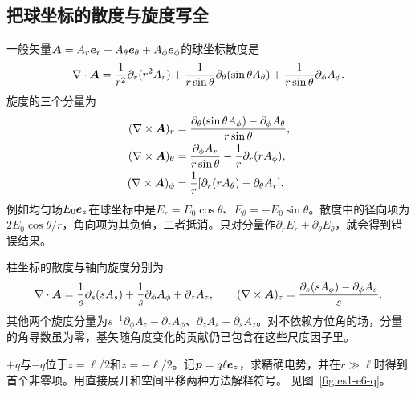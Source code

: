 \subsection{把球坐标的散度与旋度写全}
一般矢量$\bm{A}=A_r\bm{e}_r+A_\theta\bm{e}_\theta+A_\phi\bm{e}_\phi$的球坐标散度是
\[\nabla\cdot\bm{A}=\frac1{r^2}\partial_r(r^2A_r)
+\frac1{r\sin\theta}\partial_\theta(\sin\theta A_\theta)
+\frac1{r\sin\theta}\partial_\phi A_\phi.
\]
旋度的三个分量为
\[\begin{aligned}
(\nabla\times\bm{A})_r&=\frac{\partial_\theta(\sin\theta A_\phi)-\partial_\phi A_\theta}{r\sin\theta},\\
(\nabla\times\bm{A})_\theta&=\frac{\partial_\phi A_r}{r\sin\theta}-\frac1r\partial_r(rA_\phi),\\
(\nabla\times\bm{A})_\phi&=\frac1r[\partial_r(rA_\theta)-\partial_\theta A_r].
\end{aligned}\]
例如均匀场$E_0\bm{e}_z$在球坐标中是$E_r=E_0\cos\theta$、$E_\theta=-E_0\sin\theta$。散度中的径向项为$2E_0\cos\theta/r$，角向项为其负值，二者抵消。只对分量作$\partial_rE_r+\partial_\theta E_\theta$，就会得到错误结果。

柱坐标的散度与轴向旋度分别为
\[\nabla\cdot\bm{A}=\frac1s\partial_s(sA_s)+\frac1s\partial_\phi A_\phi+\partial_zA_z,
\qquad (\nabla\times\bm{A})_z=\frac{\partial_s(sA_\phi)-\partial_\phi A_s}{s}.
\]
其他两个旋度分量为$s^{-1}\partial_\phi A_z-\partial_zA_\phi$、$\partial_zA_s-\partial_sA_z$。对不依赖方位角的场，分量的角导数虽为零，基矢随角度变化的贡献仍已包含在这些尺度因子里。

\begin{example}[由有限电荷对得到偶极势]\label{ex:es1-e6}
$+q$与$-q$位于$z=\ell/2$和$z=-\ell/2$。记$\bm{p}=q\ell\bm{e}_z$，求精确电势，并在$r\gg\ell$时得到首个非零项。用直接展开和空间平移两种方法解释符号。 见图~\ref{fig:es1-e6-q}。
\end{example}

